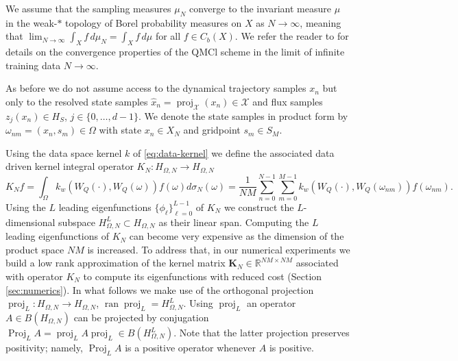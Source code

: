 \documentclass[letterpaper,10pt,3p,preprint]{elsarticle}
\newcommand{\Rbb}{\mathbb{R}}
\newcommand{\Xcal}{\mathcal{X}}
\DeclareMathOperator{\ran}{ran}
\DeclareMathOperator{\proj}{proj}
\DeclareMathOperator{\Proj}{Proj}
\newcommand{\matr}[1]{\bm{#1}}
\begin{document}
We assume that the sampling measures $\mu_N$ converge to
the invariant measure $\mu$
in the weak-$*$ topology of Borel probability measures
on $X$ as $N\to\infty$, meaning that
$\lim_{N\to\infty}\int_Xf\,d\mu_N=\int_Xf\,d\mu$
for all $f\in C_b(X)$.
We refer the reader to
\cite{Freeman2023,Freeman2024}
for details on the convergence properties of the QMCl
scheme in the limit of infinite training data
$N\rightarrow\infty$.

As before we do not assume access to the dynamical trajectory
samples $x_n$ but only to the resolved state samples
$\hat{x}_n=\proj_\Xcal(x_n)\in\mathcal{X}$
and flux samples $z_j(x_n)\in H_S$,
$j\in\{0,\ldots,d-1\}$.
We denote the state samples in product form by
$\omega_{nm}=(x_n,s_m)\in\Omega$
with state $x_n\in X_N$
and gridpoint $s_m\in S_M$.

Using the data space kernel $k$ of \eqref{eq:data-kernel}
we define the associated data driven kernel integral operator
$K_N\colon H_{\Omega,N}\rightarrow H_{\Omega,N}$
\begin{equation}\label{eq:data-integral-op}
    K_Nf=\int_\Omega k_w(W_Q(\cdot),W_Q(\omega))
        f(\omega)d\sigma_N(\omega)
    =\frac{1}{NM}\sum_{n=0}^{N-1}\sum_{m=0}^{M-1}
        k_w(W_Q(\cdot),W_Q(\omega_{nm}))f(\omega_{nm}).
\end{equation}
Using the $L$ leading eigenfunctions
$\{\phi_\ell\}_{\ell=0}^{L-1}$ of $K_N$
we construct the $L$-dimensional subspace
$H_{\Omega,N}^L\subset H_{\Omega,N}$
as their linear span.
Computing the $L$ leading eigenfunctions of $K_N$
can become very expensive as the dimension of the product
space $NM$ is increased.
To address that, in our numerical experiments we build
a low rank approximation of the kernel matrix
$\matr{K}_N\in\Rbb^{NM\times NM}$
associated with operator $K_N$ to compute its
eigenfunctions with reduced cost
(Section \ref{sec:numerics}).
In what follows we make use of the orthogonal projection
$\proj_L\colon H_{\Omega,N}\rightarrow H_{\Omega,N}$,
$\ran{\proj_L}=H_{\Omega,N}^L$.
Using $\proj_L$ an operator
$A\in B(H_{\Omega,N})$
can be projected by conjugation
$\Proj_LA=\proj_LA\proj_L\in B(H_{\Omega,N}^L)$.
Note that the latter projection preserves positivity; namely,
$\Proj_LA$ is a positive operator whenever $A$ is positive.
\end{document}
